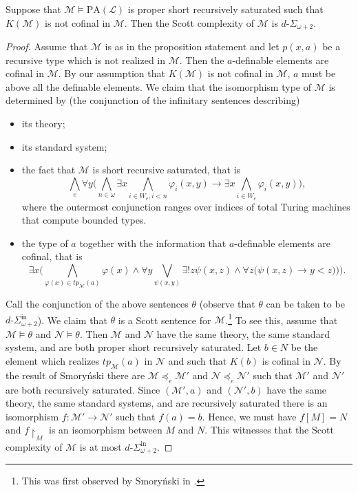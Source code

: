\documentclass[11pt]{amsart}
\newcommand{\mc}[1]{\mathcal{#1}}
\newcommand{\dSinf}[1]{d\text{-}\Sigma^{\mathrm{in}}_{#1}}
\newcommand{\PA}{\mathrm{PA}}
\renewcommand{\phi}{\varphi}
\theoremstyle{remark}
\begin{document}
\begin{proposition}
    Suppose that $\mc{M}\models\PA(\mathcal{L})$ is proper short recursively saturated such that $K(\mc{M})$ is not cofinal in $\mc{M}$. Then the Scott complexity of $\mc{M}$ is $d\text{-}\Sigma_{\omega+2}$.
\end{proposition}
\begin{proof}
    Assume that $\mc{M}$ is as in the proposition statement and let $p(x,a)$ be a recursive type which is not realized in $\mc{M}$. Then the $a$-definable elements are cofinal in $\mc{M}$. By our assumption that $K(\mc{M})$ is not cofinal in $\mc{M}$, $a$ must be above all the definable elements.  We claim that the isomorphism type of $\mc{M}$ is determined by (the conjunction of the infinitary sentences describing)
    \begin{itemize}
        \item[(a)] its theory;
        \item[(b)] its standard system;
        \item[(c)] the fact that $\mc{M}$ is short recursive saturated, that is
    \[\bigwedge_{e}\forall y\bigl(\bigwedge_{n\in\omega} \exists x\bigwedge_{i\in W_e, i<n}\phi_i(x,y)\rightarrow \exists x\bigwedge_{i\in W_e}\phi_i(x,y)\bigr),\]
    where the outermost conjunction ranges over indices of total Turing machines that compute bounded types.
    \item[(d)] the type of $a$ together with the information that $a$-definable elements are cofinal, that is
     \[\exists x \bigl(\bigwedge_{\phi(x)\in tp_{\mc{M}}(a)} \phi(x) \wedge\forall y\bigvee_{\psi(x,y)}\exists !z \psi(x,z)\wedge \forall z\bigl(\psi(x,z)\rightarrow y<z)\bigr)\bigr).\]
    \end{itemize}
		Call the conjunction of the above sentences $\theta$ (observe that $\theta$ can be taken to be $\dSinf{\omega+2}$). We claim that $\theta$ is a Scott sentence for $\mc{M}$.\footnote{This was first observed by Smoryński in \cite[Theorem 2.9]{Smor1981}.} To see this, assume that $\mc{M}\models \theta$ and $\mc{N}\models \theta$. Then $\mc{M}$ and $\mc{N}$ have the same theory, the same standard system, and are both proper short recursively saturated. Let $b\in N$ be the element which realizes $tp_{\mc{M}}(a)$ in $\mc{N}$ and such that $K(b)$ is cofinal in $\mc{N}$. By the result of Smoryński there are $\mc{M}\preceq_e \mc{M}'$ and $\mc{N}\preceq_e\mc{N}'$ such that $\mc{M}'$ and $\mc{N}'$ are both recursively saturated. Since $(\mc{M}',a)$ and $(\mc{N}',b)$ have the same theory, the same standard systems, and are recursively saturated there is an isomorphism $f:\mc{M}'\rightarrow \mc{N}'$ such that $f(a) = b$. Hence, we must have $f[M] = N$
        and  $f\upharpoonright_{M}$ is an isomorphism between $M$ and $N$. This witnesses that the Scott complexity of $\mc{M}$ is at most $\dSinf{\omega+2}$.


\end{proof}
\end{document}
